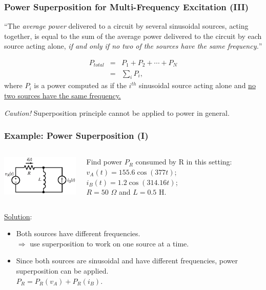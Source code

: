 \documentclass{beamer}
\begin{document}
\begin{frame}[fragile]
\frametitle{Power Superposition for Multi-Frequency Excitation (III)}

``The \emph{average power} delivered to a circuit by several sinusoidal sources, acting together, is equal to the sum of the average power delivered to the circuit by each source acting alone, \emph{\color{red} if and only if no two of the sources have the same frequency.}''

\begin{eqnarray}
P_{total} &=& P_1 + P_2 + \cdots + P_N
\nonumber \\
&=& \sum_i P_i
\nonumber ,
\end{eqnarray}
where $P_i$ is a power computed as if the $i^{th}$ sinusoidal source acting alone and \underline{\color{blue}no two sources have the same frequency.}


\emph{\color{red}Caution!} Superposition principle cannot be applied to power in general.
\end{frame}


\begin{frame}[fragile]
\frametitle{Example: Power Superposition (I)}

\begin{columns}[c]

\includegraphics[width=\textwidth]{src/super_example1.png}

Find power $P_R$ consumed by R in this setting:
$v_A(t) = 155.6 \cos(377 t)$;
$i_B(t) = 1.2 \cos(314.16 t)$;
\\
$R = 50$ $\Omega$ and $L = 0.5$ H.
\end{columns}

\underline{Solution}:
\begin{itemize}
\item Both sources have different frequencies.
\\
$\Rightarrow$ use superposition to work on one source at a time.
\item Since both sources are sinusoidal and have different frequencies,
power superposition can be applied.
\\
$P_R = P_R(v_A) + P_R(i_B)$.
\end{itemize}


\end{frame}
\end{document}
